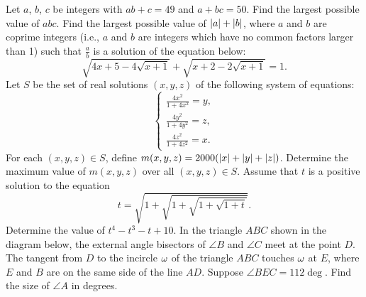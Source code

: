 \begin{enumerate}
\begin{center}
    \end{center}
    \hyperrefitem[Q::2022-O-1-11] Let $a$, $b$, $c$ be integers with $ab + c = 49$ and $a + bc = 50$. Find the largest possible value of $abc$.
    \hyperrefitem[Q::2022-O-1-12] Find the largest possible value of $\left\lvert a \right\rvert + \left\lvert b \right\rvert$, where $a$ and $b$ are coprime integers (i.e., $a$ and $b$ are integers which have no common factors larger than 1) such that $\frac{a}{b}$ is a solution of the equation below: \[\sqrt{4x + 5 - 4\sqrt{x+1}} + \sqrt{x+2 - 2\sqrt{x+1}} = 1.\]
    \hyperrefitem[Q::2022-O-1-13] Let $S$ be the set of real solutions $(x, y, z)$ of the following system of equations: \[\left\{
        \begin{aligned}
            \frac{4x^2}{1 + 4x^2} = y,\\
            \frac{4y^2}{1 + 4y^2} = z,\\
            \frac{4z^2}{1 + 4z^2} = x.
        \end{aligned}\right.\] For each $(x, y, z) \in S$, define $m(x, y, z) = 2000(\left\lvert x \right\rvert + \left\lvert y \right\rvert + \left\lvert z \right\rvert)$. Determine the maximum value of $m(x, y, z)$ over all $(x, y, z) \in S$.
    \hyperrefitem[Q::2022-O-1-14] Assume that $t$ is a positive solution to the equation \[t = \sqrt{1 + \sqrt{1 + \sqrt{1 + \sqrt{1 + t}}}}.\] Determine the value of $t^4 - t^3 - t + 10$.
    \hyperrefitem[Q::2022-O-1-15] In the triangle $ABC$ shown in the diagram below, the external angle bisectors of $\angle B$ and $\angle C$ meet at the point $D$. The tangent from $D$ to the incircle $\omega$ of the triangle $ABC$ touches $\omega$ at $E$, where $E$ and $B$ are on the same side of the line $AD$. Suppose $\angle BEC = 112\deg$. Find the size of $\angle A$ in degrees.

    \begin{center}
\end{center}
\end{enumerate}
